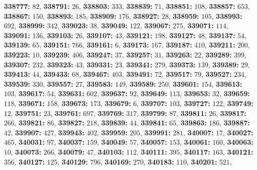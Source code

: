 \textsf{\bfseries 338777:} $82$, \textsf{\bfseries 338791:} $26$, \textsf{\bfseries 338803:} $333$, \textsf{\bfseries 338839:} $71$, \textsf{\bfseries 338851:} $108$, \textsf{\bfseries 338857:} $653$, \textsf{\bfseries 338867:} $150$, \textsf{\bfseries 338893:} $185$, \textsf{\bfseries 338909:} $176$, \textsf{\bfseries 338927:} $28$, \textsf{\bfseries 338959:} $105$, \textsf{\bfseries 338993:} $692$, \textsf{\bfseries 338999:} $342$, \textsf{\bfseries 339023:} $38$, \textsf{\bfseries 339049:} $122$, \textsf{\bfseries 339067:} $275$, \textsf{\bfseries 339071:} $114$, \textsf{\bfseries 339091:} $136$, \textsf{\bfseries 339103:} $26$, \textsf{\bfseries 339107:} $43$, \textsf{\bfseries 339121:} $198$, \textsf{\bfseries 339127:} $48$, \textsf{\bfseries 339137:} $54$, \textsf{\bfseries 339139:} $65$, \textsf{\bfseries 339151:} $766$, \textsf{\bfseries 339161:} $6$, \textsf{\bfseries 339173:} $167$, \textsf{\bfseries 339187:} $410$, \textsf{\bfseries 339211:} $200$, \textsf{\bfseries 339223:} $10$, \textsf{\bfseries 339239:} $406$, \textsf{\bfseries 339247:} $37$, \textsf{\bfseries 339257:} $31$, \textsf{\bfseries 339263:} $22$, \textsf{\bfseries 339289:} $399$, \textsf{\bfseries 339307:} $232$, \textsf{\bfseries 339323:} $43$, \textsf{\bfseries 339331:} $23$, \textsf{\bfseries 339341:} $279$, \textsf{\bfseries 339373:} $139$, \textsf{\bfseries 339389:} $29$, \textsf{\bfseries 339413:} $44$, \textsf{\bfseries 339433:} $68$, \textsf{\bfseries 339467:} $403$, \textsf{\bfseries 339491:} $72$, \textsf{\bfseries 339517:} $79$, \textsf{\bfseries 339527:} $234$, \textsf{\bfseries 339539:} $330$, \textsf{\bfseries 339557:} $27$, \textsf{\bfseries 339583:} $149$, \textsf{\bfseries 339589:} $250$, \textsf{\bfseries 339601:} $154$, \textsf{\bfseries 339613:} $103$, \textsf{\bfseries 339617:} $54$, \textsf{\bfseries 339631:} $602$, \textsf{\bfseries 339637:} $92$, \textsf{\bfseries 339649:} $113$, \textsf{\bfseries 339653:} $32$, \textsf{\bfseries 339659:} $118$, \textsf{\bfseries 339671:} $158$, \textsf{\bfseries 339673:} $173$, \textsf{\bfseries 339679:} $6$, \textsf{\bfseries 339707:} $103$, \textsf{\bfseries 339727:} $122$, \textsf{\bfseries 339749:} $12$, \textsf{\bfseries 339751:} $23$, \textsf{\bfseries 339761:} $697$, \textsf{\bfseries 339769:} $317$, \textsf{\bfseries 339799:} $87$, \textsf{\bfseries 339811:} $26$, \textsf{\bfseries 339817:} $266$, \textsf{\bfseries 339821:} $86$, \textsf{\bfseries 339827:} $218$, \textsf{\bfseries 339839:} $44$, \textsf{\bfseries 339841:} $65$, \textsf{\bfseries 339863:} $186$, \textsf{\bfseries 339887:} $42$, \textsf{\bfseries 339907:} $427$, \textsf{\bfseries 339943:} $402$, \textsf{\bfseries 339959:} $205$, \textsf{\bfseries 339991:} $281$, \textsf{\bfseries 340007:} $17$, \textsf{\bfseries 340027:} $465$, \textsf{\bfseries 340031:} $97$, \textsf{\bfseries 340037:} $159$, \textsf{\bfseries 340049:} $57$, \textsf{\bfseries 340057:} $153$, \textsf{\bfseries 340061:} $160$, \textsf{\bfseries 340063:} $10$, \textsf{\bfseries 340073:} $266$, \textsf{\bfseries 340079:} $47$, \textsf{\bfseries 340103:} $112$, \textsf{\bfseries 340111:} $395$, \textsf{\bfseries 340117:} $163$, \textsf{\bfseries 340121:} $356$, \textsf{\bfseries 340127:} $125$, \textsf{\bfseries 340129:} $796$, \textsf{\bfseries 340169:} $270$, \textsf{\bfseries 340183:} $110$, \textsf{\bfseries 340201:} $521$, 
